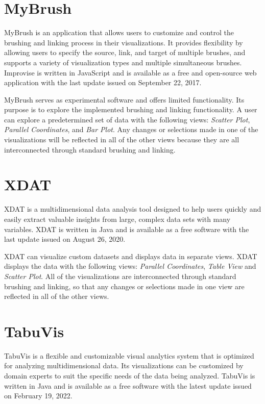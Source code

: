\section{MyBrush}

MyBrush \parencite{koytek2017mybrush} is an application that allows
users to customize and control the brushing and linking process in
their visualizations. It provides flexibility by allowing users to
specify the source, link, and target of multiple brushes, and supports
a variety of visualization types and multiple simultaneous
brushes. Improvise is written in JavaScript and is available as a free
and open-source web application with the last update issued on
September 22, 2017.

MyBrush serves as experimental software and offers limited
functionality. Its purpose is to explore the implemented brushing and
linking functionality.  A user can explore a predetermined set of data
with the following views: \emph{Scatter Plot}, \emph{Parallel
Coordinates}, and \emph{Bar Plot}. Any changes or selections made in
one of the visualizations will be reflected in all of the other views
because they are all interconnected through standard brushing and
linking.




\section{XDAT}

XDAT \parencite{XDAT} is a multidimensional data analysis tool
designed to help users quickly and easily extract valuable insights
from large, complex data sets with many variables. XDAT is written in
Java and is available as a free software with the last update issued
on August 26, 2020.

XDAT can visualize custom datasets and displays data in separate
views. XDAT displays the data with the following views: \emph{Parallel
Coordinates}, \emph{Table View} and \emph{Scatter Plot}. All of the
visualizations are interconnected through standard brushing and
linking, so that any changes or selections made in one view are
reflected in all of the other views.



\section{TabuVis}

TabuVis \parencite{nguyen2013tabuvis} is a flexible and customizable
visual analytics system that is optimized for analyzing
multidimensional data. Its visualizations can be customized by domain
experts to suit the specific needs of the data being analyzed. TabuVis
is written in Java and is available as a free software with the latest
update issued on February 19, 2022.

